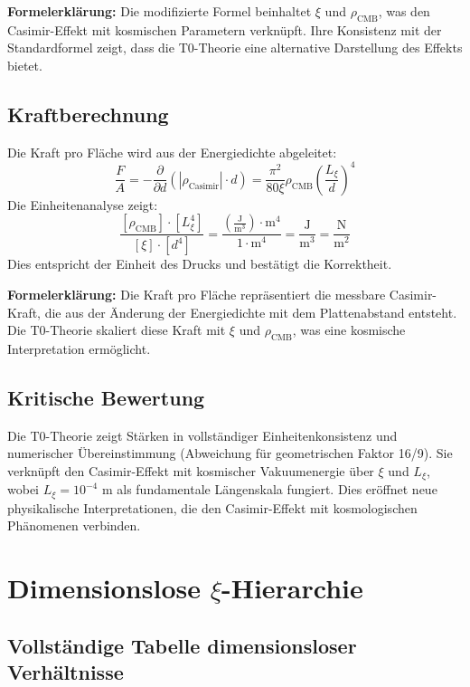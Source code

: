 	\textbf{Formelerklärung:} Die modifizierte Formel beinhaltet $\xi$ und $\rho_{\text{CMB}}$, was den Casimir-Effekt mit kosmischen Parametern verknüpft. Ihre Konsistenz mit der Standardformel zeigt, dass die T0-Theorie eine alternative Darstellung des Effekts bietet.
	
	\subsection{Kraftberechnung}
	Die Kraft pro Fläche wird aus der Energiedichte abgeleitet:
	\begin{equation}
		\frac{F}{A} = -\frac{\partial}{\partial d} \left( |\rho_{\text{Casimir}}| \cdot d \right) = \frac{\pi^2}{80 \xi} \rho_{\text{CMB}} \left( \frac{L_\xi}{d} \right)^4
	\end{equation}
	Die Einheitenanalyse zeigt:
	\begin{equation}
		\frac{[\rho_{\text{CMB}}] \cdot [L_\xi^4]}{[\xi] \cdot [d^4]} = \frac{\left( \frac{\text{J}}{\text{m}^3} \right) \cdot \text{m}^4}{1 \cdot \text{m}^4} = \frac{\text{J}}{\text{m}^3} = \frac{\text{N}}{\text{m}^2}
	\end{equation}
	Dies entspricht der Einheit des Drucks und bestätigt die Korrektheit.
	
	\textbf{Formelerklärung:} Die Kraft pro Fläche repräsentiert die messbare Casimir-Kraft, die aus der Änderung der Energiedichte mit dem Plattenabstand entsteht. Die T0-Theorie skaliert diese Kraft mit $\xi$ und $\rho_{\text{CMB}}$, was eine kosmische Interpretation ermöglicht.
	
	\subsection{Kritische Bewertung}
	Die T0-Theorie zeigt Stärken in vollständiger Einheitenkonsistenz und numerischer Übereinstimmung (Abweichung für geometrischen Faktor 16/9). Sie verknüpft den Casimir-Effekt mit kosmischer Vakuumenergie über $\xi$ und $L_\xi$, wobei $L_\xi = 10^{-4}$ m als fundamentale Längenskala fungiert. Dies eröffnet neue physikalische Interpretationen, die den Casimir-Effekt mit kosmologischen Phänomenen verbinden.
	
	\section{Dimensionslose $\xi$-Hierarchie}
	
	\subsection{Vollständige Tabelle dimensionsloser Verhältnisse}
	
